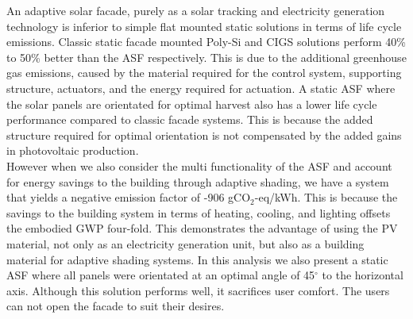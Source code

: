 
An adaptive solar facade, purely as a solar tracking and electricity generation technology is inferior to simple flat mounted static solutions in terms of life cycle emissions.  Classic static facade mounted Poly-Si and CIGS solutions perform 40\% to 50\% better than the ASF respectively. This is due to the additional greenhouse gas emissions, caused by the material required for the control system, supporting structure, actuators, and the energy required for actuation. A static ASF where the solar panels are orientated for optimal harvest also has a lower life cycle performance compared to classic facade systems. This is because the added structure required for optimal orientation is not compensated by the added gains in photovoltaic production.\\

However when we also consider the multi functionality of the ASF and account for energy savings to the building through adaptive shading, we have a system that yields a negative emission factor of  -906 gCO$_{2}$-eq/kWh. This is because the savings to the building system in terms of heating, cooling, and lighting offsets the embodied GWP four-fold. This demonstrates the advantage of using the PV material, not only as an electricity generation unit, but also as a building material for adaptive shading systems. In this analysis we also present a static ASF where all panels were orientated at an optimal angle of 45$^{\circ}$ to the horizontal axis. Although this solution performs well, it sacrifices user comfort. The users can not open the facade to suit their desires.\\


